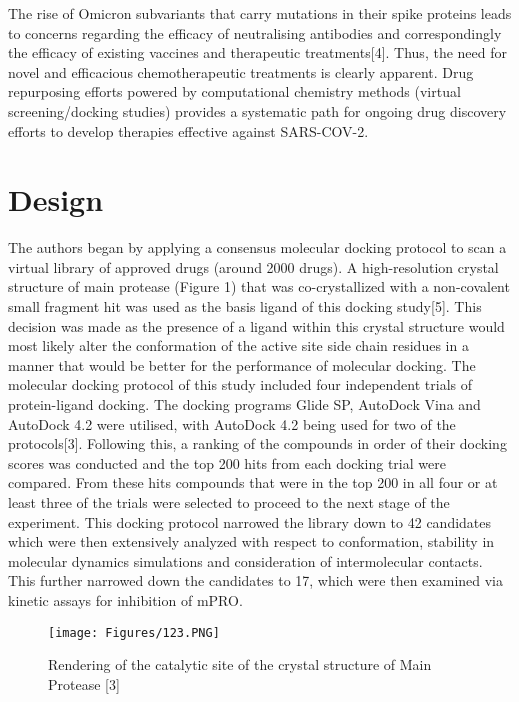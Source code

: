 \documentclass[
]{article}
\begin{document}
The rise of Omicron subvariants that carry mutations in their spike
proteins leads to concerns regarding the efficacy of neutralising
antibodies and correspondingly the efficacy of existing vaccines and
therapeutic treatments{[}4{]}. Thus, the need for novel and efficacious
chemotherapeutic treatments is clearly apparent. Drug repurposing
efforts powered by computational chemistry methods (virtual
screening/docking studies) provides a systematic path for ongoing drug
discovery efforts to develop therapies effective against SARS-COV-2.

\hypertarget{design}{%
\section{Design}\label{design}}

The authors began by applying a consensus molecular docking protocol to
scan a virtual library of approved drugs (around 2000 drugs). A
high-resolution crystal structure of main protease (Figure 1) that was
co-crystallized with a non-covalent small fragment hit was used as the
basis ligand of this docking study{[}5{]}. This decision was made as the
presence of a ligand within this crystal structure would most likely
alter the conformation of the active site side chain residues in a
manner that would be better for the performance of molecular docking.
The molecular docking protocol of this study included four independent
trials of protein-ligand docking. The docking programs Glide SP,
AutoDock Vina and AutoDock 4.2 were utilised, with AutoDock 4.2 being
used for two of the protocols{[}3{]}. Following this, a ranking of the
compounds in order of their docking scores was conducted and the top 200
hits from each docking trial were compared. From these hits compounds
that were in the top 200 in all four or at least three of the trials
were selected to proceed to the next stage of the experiment. This
docking protocol narrowed the library down to 42 candidates which were
then extensively analyzed with respect to conformation, stability in
molecular dynamics simulations and consideration of intermolecular
contacts. This further narrowed down the candidates to 17, which were
then examined via kinetic assays for inhibition of mPRO.

\begin{figure}[htp]
    \centering
    \texttt{[image: Figures/123.PNG]}
    \caption{Rendering of the catalytic site of the crystal structure of Main Protease [3]}
    \label{fig:spectra}
\end{figure}
\end{document}
